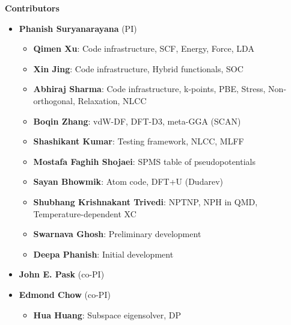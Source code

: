   \begin{frame}[allowframebreaks]{\textbf{Contributors}} \label{Contributors}

	\begin{itemize}
	\item \textbf{Phanish Suryanarayana} (PI)
	\begin{itemize}
 	    \item \textbf{Qimen Xu}: Code infrastructure, SCF, Energy, Force, LDA \\  
        \item \textbf{Xin Jing}: Code infrastructure, Hybrid functionals, SOC \\  
 	    \item \textbf{Abhiraj Sharma}: Code infrastructure, k-points, PBE, Stress, Non-orthogonal, Relaxation, NLCC \\   
 	    \item \textbf{Boqin Zhang}: vdW-DF, DFT-D3, meta-GGA (SCAN) \\  
 	    \item \textbf{Shashikant Kumar}: Testing framework, NLCC, MLFF \\  
            \item \textbf{Mostafa Faghih Shojaei}: SPMS table of pseudopotentials \\ 
            \item \textbf{Sayan Bhowmik\footnotemark[1]}: Atom code, DFT+U (Dudarev) \\
            \item \textbf{Shubhang Krishnakant Trivedi}: NPTNP, NPH in QMD, Temperature-dependent XC \\
            \item \textbf{Swarnava Ghosh}: Preliminary development \\
            \item \textbf{Deepa Phanish}: Initial development
 	\end{itemize}
    \item \textbf{John E. Pask} (co-PI)
    \item \textbf{Edmond Chow} (co-PI)
    \begin{itemize}
        \item \textbf{Hua Huang}: Subspace eigensolver, DP

\end{itemize}
\end{itemize}
\end{frame}
